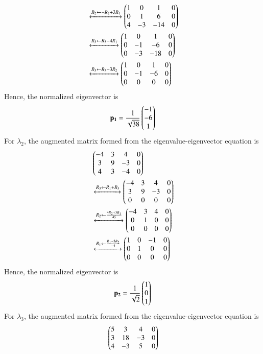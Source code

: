 \documentclass[journal,12pt,twocolumn]{IEEEtran}
\renewcommand{\vec}[1]{\boldsymbol{\mathbf{#1}}}
\begin{document}
\begin{enumerate}
\begin{enumerate}
\begin{align}
            &\xleftrightarrow[]{R_2 \leftarrow -R_2+3R_1} \begin{pmatrix}1&0&1&0\\0&1&6&0\\4&-3&-14&0\end{pmatrix} \\
            &\xleftrightarrow[]{R_3 \leftarrow R_3-4R_1} \begin{pmatrix}1&0&1&0\\0&-1&-6&0\\0&-3&-18&0\end{pmatrix} \\
            &\xleftrightarrow[]{R_3 \leftarrow R_3-3R_2} \begin{pmatrix}1&0&1&0\\0&-1&-6&0\\0&0&0&0\end{pmatrix}
        \end{align}
        Hence, the normalized eigenvector is
        \begin{align}
            \vec{p_1} = \frac{1}{\sqrt{38}}\myvec{-1\\-6\\1}
        \end{align}
        For $\lambda_2$, the augmented matrix formed from the 
        eigenvalue-eigenvector equation is
        \begin{align}
            &\begin{pmatrix}-4&3&4&0\\3&9&-3&0\\4&3&-4&0\end{pmatrix} \nonumber \\
            &\xleftrightarrow[]{R_3 \leftarrow R_1+R_3} \begin{pmatrix}-4&3&4&0\\3&9&-3&0\\0&0&0&0\end{pmatrix} \\
            &\xleftrightarrow[]{R_2 \leftarrow \frac{4R_2+3R_1}{45}} \begin{pmatrix}-4&3&4&0\\0&1&0&0\\0&0&0&0\end{pmatrix} \\
            &\xleftrightarrow[]{R_1 \leftarrow \frac{R_1-3R_2}{-4}} \begin{pmatrix}1&0&-1&0\\0&1&0&0\\0&0&0&0\end{pmatrix}
        \end{align}
        Hence, the normalized eigenvector is
        \begin{align}
            \vec{p_2} = \frac{1}{\sqrt{2}}\myvec{1\\0\\1}
        \end{align}
        For $\lambda_3$, the augmented matrix formed from the 
        eigenvalue-eigenvector equation is
        \begin{align}
            &\myvec{5&3&4&0\\3&18&-3&0\\4&-3&5&0} \nonumber \\ 

\end{align}
\end{enumerate}
\end{enumerate}
\end{document}

